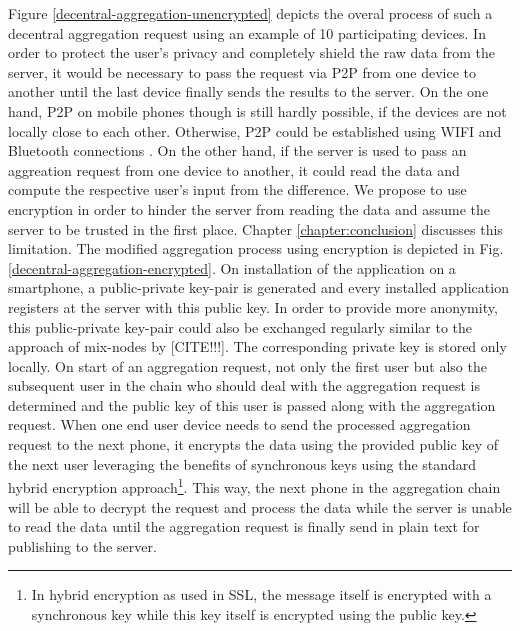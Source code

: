 Figure \ref{decentral-aggregation-unencrypted} depicts the overal process of such a decentral aggregation request using an example of 10 participating devices.
In order to protect the user's privacy and completely shield the raw data from the server, it would be necessary to pass the request via P2P from one device to another until the last device finally sends the results to the server. On the one hand, P2P on mobile phones though is still hardly possible, if the devices are not locally close to each other. Otherwise, P2P could be established using WIFI and Bluetooth connections \parencite{p2p-android}. On the other hand, if the server is used to pass an aggreation request from one device to another, it could read the data and compute the respective user's input from the difference. We propose to use encryption in order to hinder the server from reading the data and assume the server to be trusted in the first place. Chapter \ref{chapter:conclusion} discusses this limitation. The modified aggregation process using encryption is depicted in Fig. \ref{decentral-aggregation-encrypted}. On installation of the application on a smartphone, a public-private key-pair is generated and every installed application registers at the server with this public key. In order to provide more anonymity, this public-private key-pair could also be exchanged regularly similar to the approach of mix-nodes by [CITE!!!]. The corresponding private key is stored only locally. On start of an aggregation request, not only the first user but also the subsequent user in the chain who should deal with the aggregation request is determined and the public key of this user is passed along with the aggregation request. When one end user device needs to send the processed aggregation request to the next phone, it encrypts the data using the provided public key of the next user leveraging the benefits of synchronous keys using the standard hybrid encryption approach\footnote{In hybrid encryption as used in SSL, the message itself is encrypted with a synchronous key while this key itself is encrypted using the public key.}. This way, the next phone in the aggregation chain will be able to decrypt the request and process the data while the server is unable to read the data until the aggregation request is finally send in plain text for publishing to the server. 

